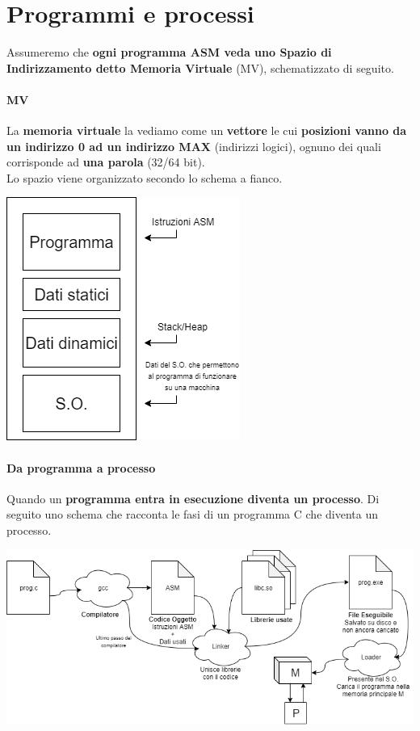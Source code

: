 \documentclass[10pt]{report}
\begin{document}
\section{Programmi e processi}
Assumeremo che \textbf{ogni programma ASM veda uno Spazio di Indirizzamento detto Memoria Virtuale} (MV), schematizzato di seguito.
\begin{multicols}{2}
\paragraph{MV} La \textbf{memoria virtuale} la vediamo come un \textbf{vettore} le cui \textbf{posizioni vanno da un indirizzo 0 ad un indirizzo MAX} (indirizzi logici), ognuno dei quali corrisponde ad \textbf{una parola} (32/64 bit).\\
Lo spazio viene organizzato secondo lo schema a fianco.
\columnbreak
\begin{center}
\includegraphics[scale=0.6]{progproc.png}
\end{center}
\end{multicols}
\paragraph{Da programma a processo} Quando un \textbf{programma entra in esecuzione diventa un processo}. Di seguito uno schema che racconta le fasi di un programma C che diventa un processo.
\begin{center}
\includegraphics[scale=0.6]{prog2proc.png}
\end{center}
\pagebreak
\end{document}
